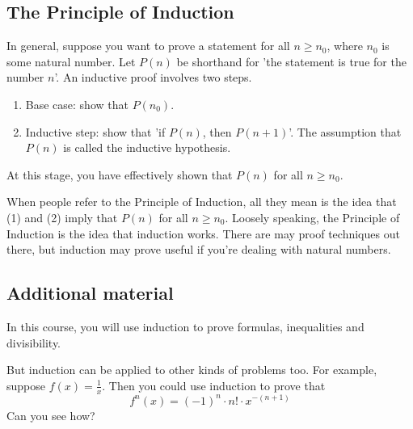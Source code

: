 \documentclass{scrreprt}
\begin{document}
\subsection*{The Principle of Induction}
In general, suppose you want to prove a statement for all $n \geq n_0$, where $n_0$ is some natural number. Let $P(n)$ be shorthand for 'the statement is true for the number $n$'. An inductive proof involves two steps.
\begin{enumerate}
    \item Base case: show that $P(n_0)$.
    \item Inductive step: show that 'if $P(n)$, then $P(n + 1)$'. The assumption that $P(n)$ is called the inductive hypothesis.
\end{enumerate}
At this stage, you have effectively shown that $P(n)$ for all $n \geq n_0$.

When people refer to the Principle of Induction, all they mean is the idea that (1) and (2) imply that $P(n)$ for all $n \geq n_0$. Loosely speaking, the Principle of Induction is the idea that induction works. There are may proof techniques out there, but induction may prove useful if you're dealing with natural numbers.

\subsection*{Additional material}
In this course, you will use induction to prove formulas, inequalities and divisibility.

But induction can be applied to other kinds of problems too. For example, suppose $f(x) = \frac{1}{x}$. Then you could use induction to prove that $$f^n(x) = (-1)^n \cdot n! \cdot x^{-(n + 1)}$$ Can you see how?
\end{document}
